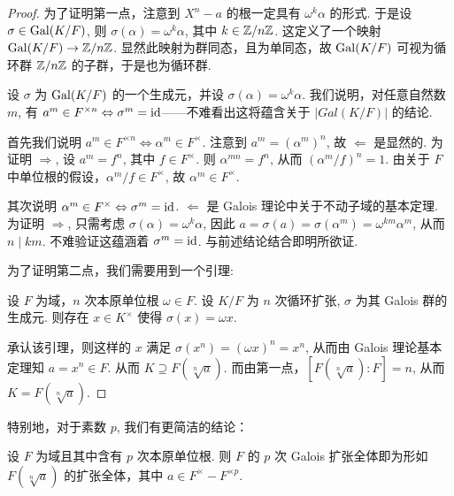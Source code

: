 \begin{proof}
  为了证明第一点，注意到 $X^n - a$ 的根一定具有 $\omega^k \alpha$ 的形式.  于是设 $\sigma \in \operatorname{Gal}(K/F)$, 则 $\sigma(\alpha) = \omega^k \alpha$, 其中 $k \in \mathbb Z/n\mathbb Z$.  这定义了一个映射 $\operatorname{Gal}(K/F) \to \mathbb Z/n\mathbb Z$.  显然此映射为群同态，且为单同态，故 $\operatorname{Gal}(K/F)$ 可视为循环群 $\mathbb Z/n\mathbb Z$ 的子群，于是也为循环群.

  设 $\sigma$ 为 $\operatorname{Gal}(K/F)$ 的一个生成元，并设 $\sigma(\alpha) = \omega^k \alpha$.  我们说明，对任意自然数 $m$, 有 $a^m \in F^{\times n} \Leftrightarrow \sigma^m = \operatorname{id}$——不难看出这将蕴含关于 $|Gal(K/F)|$ 的结论.

  首先我们说明 $a^m \in F^{\times n} \Leftrightarrow \alpha^m \in F^\times$.  注意到 $a^m = (\alpha^m)^n$, 故 $\Leftarrow$ 是显然的.  为证明 $\Rightarrow$, 设 $a^m = f^n$, 其中 $f \in F^\times$.  则 $\alpha^{mn} = f^n$, 从而 $(\alpha^m/f)^n = 1$.  由关于 $F$ 中单位根的假设，$\alpha^m/f \in F^\times$, 故 $\alpha^m \in F^\times$.

  其次说明 $\alpha^m \in F^\times \Leftrightarrow \sigma^m = \operatorname{id}$.  $\Leftarrow$ 是 Galois 理论中关于不动子域的基本定理.  为证明 $\Rightarrow$, 只需考虑 $\sigma(\alpha) = \omega^k \alpha$, 因此 $a = \sigma(a) = \sigma(\alpha^m) = \omega^{km} \alpha^m$, 从而 $n \mid km$.  不难验证这蕴涵着 $\sigma^m = \operatorname{id}$.  与前述结论结合即明所欲证.

  为了证明第二点，我们需要用到一个引理:
  \begin{lemma}[Hilbert “定理 90”]
    设 $F$ 为域，$n$ 次本原单位根 $\omega \in F$.  设 $K/F$ 为 $n$ 次循环扩张, $\sigma$ 为其 Galois 群的生成元.  则存在 $x \in K^\times$ 使得 $\sigma(x) = \omega x$.
  \end{lemma}

  承认该引理，则这样的 $x$ 满足 $\sigma(x^n) = (\omega x)^n = x^n$, 从而由 Galois 理论基本定理知 $a = x^n \in F$.  从而 $K \supseteq F(\sqrt[n]{a})$.  而由第一点，$[F(\sqrt[n]{a}) : F] = n$, 从而 $K = F(\sqrt[n]{a})$.
\end{proof}

特别地，对于素数 $p$, 我们有更简洁的结论：
\begin{cor}
  设 $F$ 为域且其中含有 $p$ 次本原单位根.  则 $F$ 的 $p$ 次 Galois 扩张全体即为形如 $F(\sqrt[n]{a})$ 的扩张全体，其中 $a \in F^\times - F^{\times p}$.
\end{cor}
